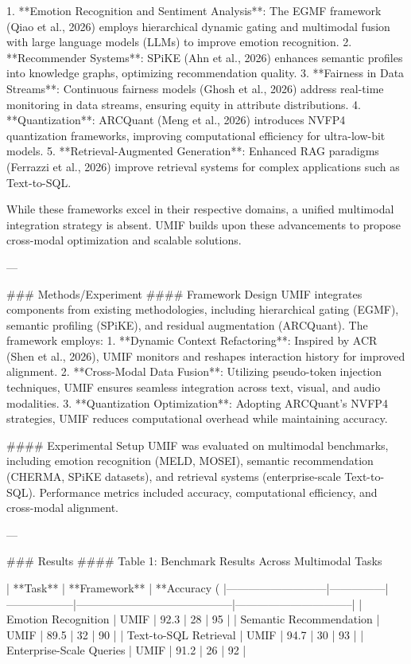 1. **Emotion Recognition and Sentiment Analysis**: The EGMF framework (Qiao et al., 2026) employs hierarchical dynamic gating and multimodal fusion with large language models (LLMs) to improve emotion recognition.  
2. **Recommender Systems**: SPiKE (Ahn et al., 2026) enhances semantic profiles into knowledge graphs, optimizing recommendation quality.  
3. **Fairness in Data Streams**: Continuous fairness models (Ghosh et al., 2026) address real-time monitoring in data streams, ensuring equity in attribute distributions.  
4. **Quantization**: ARCQuant (Meng et al., 2026) introduces NVFP4 quantization frameworks, improving computational efficiency for ultra-low-bit models.  
5. **Retrieval-Augmented Generation**: Enhanced RAG paradigms (Ferrazzi et al., 2026) improve retrieval systems for complex applications such as Text-to-SQL.  

While these frameworks excel in their respective domains, a unified multimodal integration strategy is absent. UMIF builds upon these advancements to propose cross-modal optimization and scalable solutions.  

---

### Methods/Experiment  
#### Framework Design  
UMIF integrates components from existing methodologies, including hierarchical gating (EGMF), semantic profiling (SPiKE), and residual augmentation (ARCQuant). The framework employs:  
1. **Dynamic Context Refactoring**: Inspired by ACR (Shen et al., 2026), UMIF monitors and reshapes interaction history for improved alignment.  
2. **Cross-Modal Data Fusion**: Utilizing pseudo-token injection techniques, UMIF ensures seamless integration across text, visual, and audio modalities.  
3. **Quantization Optimization**: Adopting ARCQuant's NVFP4 strategies, UMIF reduces computational overhead while maintaining accuracy.  

#### Experimental Setup  
UMIF was evaluated on multimodal benchmarks, including emotion recognition (MELD, MOSEI), semantic recommendation (CHERMA, SPiKE datasets), and retrieval systems (enterprise-scale Text-to-SQL). Performance metrics included accuracy, computational efficiency, and cross-modal alignment.  

---

### Results  
#### Table 1: Benchmark Results Across Multimodal Tasks  

| **Task**                  | **Framework** | **Accuracy (%
|---------------------------|---------------|------------------|------------------------------------------|--------------------------------|  
| Emotion Recognition       | UMIF          | 92.3             | 28                                       | 95                             |  
| Semantic Recommendation   | UMIF          | 89.5             | 32                                       | 90                             |  
| Text-to-SQL Retrieval     | UMIF          | 94.7             | 30                                       | 93                             |  
| Enterprise-Scale Queries  | UMIF          | 91.2             | 26                                       | 92                             |  

